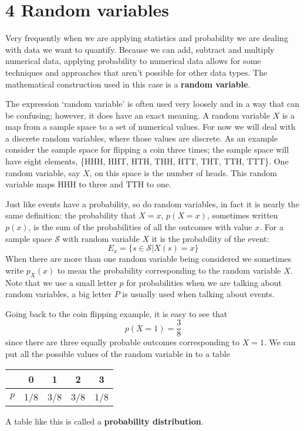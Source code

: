 \documentclass[11pt,a4paper]{scrartcl}
\begin{document}
\section*{4 Random variables}

Very frequently when we are applying statistics and probability we are
dealing with data we want to quantify. Because we can add, subtract
and multiply numerical data, applying probability to numerical data
allows for some techniques and approaches that aren't possible for
other data types. The mathematical construction used in this case is a
\textbf{random variable}.

The expression \lq{}random variable\rq{} is often used very loosely
and in a way that can be confusing; however, it does have an exact
meaning. A random variable $X$ is a map from a sample space
to a set of numerical values. For now we will deal with a discrete
random variables, where those values are discrete. As an example
consider the sample space for flipping a coin three times; the sample
space will have eight elements, \{HHH, HHT, HTH, THH, HTT, THT, TTH,
TTT\}. One random variable, say $X$, on this space is the number of
heads. This random variable maps HHH to three and TTH to one.

Just like events have a probability, so do random variables, in fact
it is nearly the same definition: the probability that $X=x$,
$p(X=x)$, sometimes written $p(x)$, is the sum of the probabilities of
all the outcomes with value $x$. For a sample space $\mathcal{S}$ with
random variable $X$ it is the probability of the event:
\begin{equation}
E_x=\{s\in \mathcal{S}|X(s)=x\}
\end{equation}
When there are more than one random variable being considered we
sometimes write $p_X(x)$ to mean the probability corresponding to the
random variable $X$. Note that we use a small letter $p$ for
probabilities when we are talking about random variables, a big letter
$P$ is usually used when talking about events.

Going back to the coin flipping example, it is easy to see that 
\begin{equation}
p(X=1)=\frac{3}{8}
\end{equation}
since there are three equally probable outcomes corresponding to
$X=1$. We can put all the possible values of the random variable in to
a table
\begin{center}
\begin{tabular}{c|cccc}
&0&1&2&3\\
\hline
$p$&1/8&3/8&3/8&1/8
\end{tabular}
\end{center}
A table like this is called a \textbf{probability distribution}.
\end{document}
